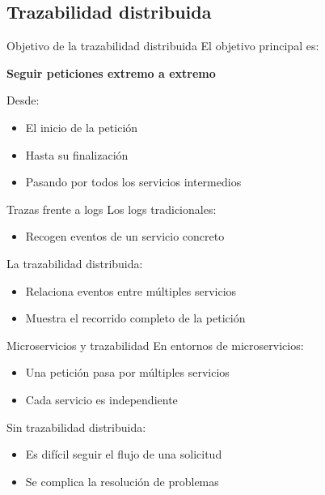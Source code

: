 \documentclass{beamer}
\begin{document}
\subsection{Trazabilidad distribuida}

\begin{frame}{Objetivo de la trazabilidad distribuida}
El objetivo principal es:
\begin{center}
\textbf{Seguir peticiones extremo a extremo}
\end{center}

\vspace{0.3cm}
Desde:
\begin{itemize}
    \item El inicio de la petición
    \item Hasta su finalización
    \item Pasando por todos los servicios intermedios
\end{itemize}
\end{frame}

\begin{frame}{Trazas frente a logs}
Los logs tradicionales:
\begin{itemize}
    \item Recogen eventos de un servicio concreto
\end{itemize}

\vspace{0.3cm}
La trazabilidad distribuida:
\begin{itemize}
    \item Relaciona eventos entre múltiples servicios
    \item Muestra el recorrido completo de la petición
\end{itemize}
\end{frame}

\begin{frame}{Microservicios y trazabilidad}
En entornos de microservicios:
\begin{itemize}
    \item Una petición pasa por múltiples servicios
    \item Cada servicio es independiente
\end{itemize}

\vspace{0.3cm}
Sin trazabilidad distribuida:
\begin{itemize}
    \item Es difícil seguir el flujo de una solicitud
    \item Se complica la resolución de problemas
\end{itemize}
\end{frame}
\end{document}
